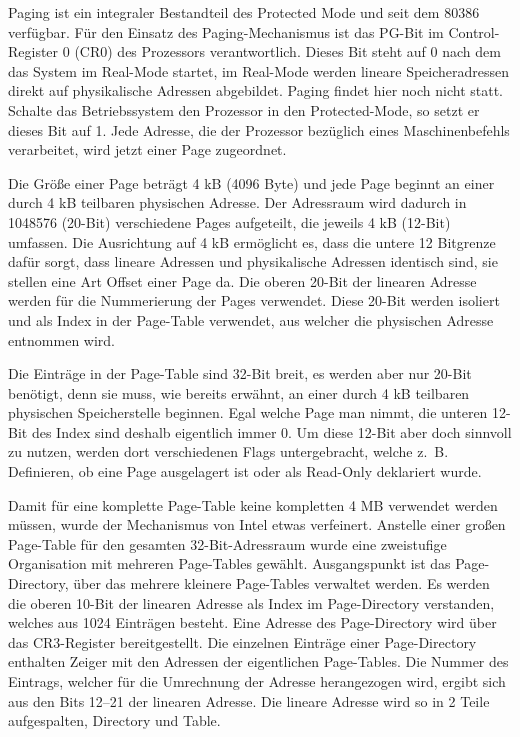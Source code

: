 \documentclass[12pt]{book}
\begin{document}
Paging ist ein integraler Bestandteil des Protected Mode und seit dem 80386
verfügbar. Für den Einsatz des Paging-Mechanismus ist das PG-Bit im
Control-Register 0 (CR0) des Prozessors verantwortlich. Dieses Bit steht auf 0
nach dem das System im Real-Mode startet, im Real-Mode werden lineare
Speicheradressen direkt auf physikalische Adressen abgebildet. Paging findet
hier noch nicht statt. Schalte das Betriebssystem den Prozessor in den
Protected-Mode, so setzt er dieses Bit auf 1. Jede Adresse, die der Prozessor
bezüglich eines Maschinenbefehls verarbeitet, wird jetzt einer Page zugeordnet.

Die Größe einer Page beträgt 4 kB (4096 Byte) und jede Page beginnt an einer
durch 4 kB teilbaren physischen Adresse. Der Adressraum wird dadurch in 1048576
(20-Bit) verschiedene Pages aufgeteilt, die jeweils 4 kB (12-Bit) umfassen. Die
Ausrichtung auf 4 kB ermöglicht es, dass die untere 12 Bitgrenze dafür sorgt,
dass lineare Adressen und physikalische Adressen identisch sind, sie stellen
eine Art Offset einer Page da. Die oberen 20-Bit der linearen Adresse werden
für die Nummerierung der Pages verwendet. Diese 20-Bit werden isoliert und als
Index in der Page-Table verwendet, aus welcher die physischen Adresse entnommen
wird.

Die Einträge in der Page-Table sind 32-Bit breit, es werden aber nur 20-Bit
benötigt, denn sie muss, wie bereits erwähnt, an einer durch 4 kB teilbaren
physischen Speicherstelle beginnen. Egal welche Page man nimmt, die unteren
12-Bit des Index sind deshalb eigentlich immer 0. Um diese 12-Bit aber doch
sinnvoll zu nutzen, werden dort verschiedenen Flags untergebracht, welche z. B.
Definieren, ob eine Page ausgelagert ist oder als Read-Only deklariert wurde.

Damit für eine komplette Page-Table keine kompletten 4 MB verwendet werden
müssen, wurde der Mechanismus von Intel etwas verfeinert.  Anstelle einer
großen Page-Table für den gesamten 32-Bit-Adressraum wurde eine zweistufige
Organisation mit mehreren Page-Tables gewählt. Ausgangspunkt ist das
Page-Directory, über das mehrere kleinere Page-Tables verwaltet werden. Es
werden die oberen 10-Bit der linearen Adresse als Index im Page-Directory
verstanden, welches aus 1024 Einträgen besteht. Eine Adresse des Page-Directory
wird über das CR3-Register bereitgestellt. Die einzelnen Einträge einer
Page-Directory enthalten Zeiger mit den Adressen der eigentlichen Page-Tables.
Die Nummer des Eintrags, welcher für die Umrechnung der Adresse herangezogen
wird, ergibt sich aus den Bits 12–21 der linearen Adresse. Die lineare Adresse
wird so in 2 Teile aufgespalten, Directory und Table.
\end{document}
